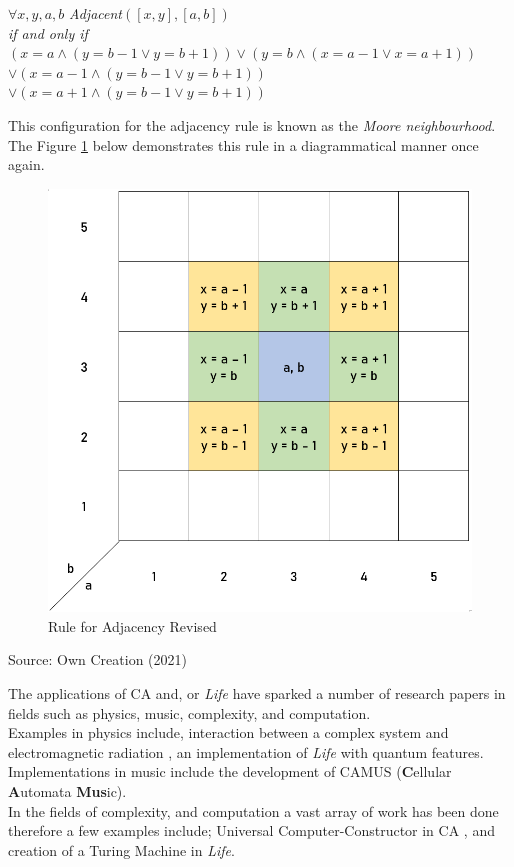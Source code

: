 \begin{center}
$\forall x, y, a, b$ \textit{Adjacent}$([x, y], [a, b])$ \\ \textit{if and only if}\\$(x = a \land (y = b - 1 \lor y = b + 1)) \lor (y = b \land (x = a - 1 \lor x = a + 1))$\\ $\lor (x = a - 1 \land (y = b - 1 \lor y = b +1))$\\ $\lor (x = a + 1 \land (y = b - 1 \lor y = b + 1))$
\end{center}
This configuration for the adjacency rule is known as the \textit{Moore neighbourhood}\cite{ca}. The Figure \ref{fig:ruleadj2} below demonstrates this rule in a diagrammatical manner once again.
\begin{figure}[H]
\centering
\includegraphics[scale=0.5]{Figures/Chapter2/adjacent2}
\caption{Rule for Adjacency Revised}
\label{fig:ruleadj2}
\end{figure}
\begin{center}
Source: Own Creation (2021)
\end{center}

The applications of CA and, or \textsl{Life} have sparked a number of research papers in fields such as physics, music, complexity, and computation. \\
Examples in physics include, interaction between a complex system and electromagnetic radiation \citep{conti}, an implementation of \textsl{Life} with quantum features.\citep{quantum}\\
Implementations in music include the development of CAMUS (\textbf{C}ellular \textbf{A}utomata \textbf{Mus}ic).\citep{music}\\
In the fields of complexity, and computation a vast array of work has been done therefore a few examples include; Universal Computer-Constructor in CA \citep{gou}, and creation of a Turing Machine in \textsl{Life}.\citep{ren}
